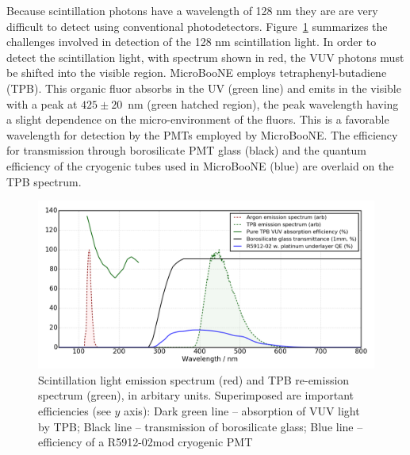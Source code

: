 Because scintillation photons have a wavelength of 128 nm they are are very difficult to detect using conventional photodetectors.  Figure~\ref{fig:lightchallenge} summarizes the challenges involved in detection of the 128 nm scintillation light.  
In order to detect the scintillation light, with spectrum shown in red, the VUV photons must be shifted into the visible region.   MicroBooNE employs tetraphenyl-butadiene (TPB).
This organic fluor absorbs in the UV (green line) and emits in the visible with a peak at $425\pm20$~nm (green hatched region), the peak wavelength having a slight dependence on the micro-environment of the fluors.  This is a favorable wavelength for detection by the PMTs employed by MicroBooNE.  The efficiency for transmission through borosilicate PMT glass (black) and the quantum efficiency of the cryogenic tubes used in MicroBooNE (blue) are overlaid on the TPB spectrum.

\begin{figure}
	\centering 
\includegraphics[width=\textwidth]{./figures/pmttpbeff.png} 
        \caption{Scintillation light emission spectrum (red) and TPB re-emission spectrum (green), in arbitary units.  Superimposed are important efficiencies (see $y$ axis):  Dark green line -- absorption of VUV light by TPB;  Black line -- transmission of borosilicate glass;  Blue line -- efficiency of a R5912-02mod cryogenic PMT \cite{Jones:2015bya} }\label{fig:lightchallenge}
\end{figure}





